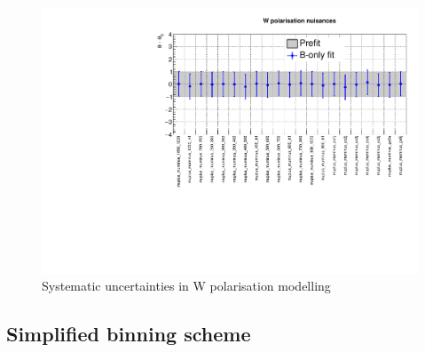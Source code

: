 \begin{figure}[h!]
  \centering
  \caption{Systematic uncertainties in W polarisation modelling}
  \includegraphics[width=0.8\linewidth]{figures/results/36invfb_freeze/postfit/nuis/WPol_nuisances}
\end{figure}

\clearpage
\subsection{Simplified binning scheme}
\label{app:aggregated}

\newcommand{\customcaption}[5]{(Upper panel) Event yields observed in
  data (solid circles) and SM expectations with their associated
  uncertainties (blue histogram with grey shaded band) determined from
  a simultaneous fit to data in the control regions only (CR-only
  fit). Event yields and expectations are shown as a function of
  \HTmiss for events in the #1 topology that are required to satisfy
  #2, #3, and (\cmsLeft) #4 or (\cmsRight) #5. 
  (Lower panel) The significance of deviations (pulls) observed in
  data with respect to both the SM expectations from the CR-only fit,
  expressed in terms of the total uncertainty in the SM
  expectations. The pulls cannot be considered independently due to
  inter-bin correlations.}

